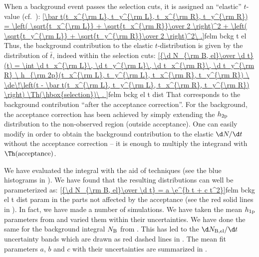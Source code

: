 When a background event passes the selection cuts, it is assigned an ``elastic'' $t$-value (cf.~):
\eqref{\bar t(t_x^{\rm L}, t_y^{\rm L}, t_x^{\rm R}, t_y^{\rm R})
= \left( \sqrt{t_x^{\rm L}} + \sqrt{t_x^{\rm R}}\over 2 \right)^2 + \left( \sqrt{t_y^{\rm L}} + \sqrt{t_y^{\rm R}}\over 2 \right)^2\ .}{felm bckg t el}
Thus, the background contribution to the elastic $t$-distribution is given by the distribution of $\bar t$, indeed within the selection cuts:
\eqref{{\d N_{\rm B, el}\over \d t}(t) = \int
	\d t_x^{\rm L}\, \d t_y^{\rm L}\, \d t_x^{\rm R}\, \d t_y^{\rm R}
	\ h_{\rm 2p}(t_x^{\rm L}, t_y^{\rm L}, t_x^{\rm R}, t_y^{\rm R})
	\ \de\!\left(t - \bar t(t_x^{\rm L}, t_y^{\rm L}, t_x^{\rm R}, t_y^{\rm R}) \right)
	\Th(\hbox{selection})\ .
}{felm bckg el t dist}
That corresponds to the background contribution ``after the acceptance correction''. For the background, the acceptance correction has been achieved by simply extending the $h_{\rm 2p}$ distribution to the non-observed region (outside acceptance). One can easily modify  in order to obtain the background contribution to the elastic $\d N/\d t$ without the acceptance correction -- it is enough to multiply the integrand with $\Th(\hbox{acceptance})$.

We have evaluated the integral  with the aid of  techniques (see the blue histograms in ). We have found that the resulting distributions can well be parameterized as:
\eqref{{\d N_{\rm B, el}\over \d t} = a \e^{b t + c t^2}}{felm bckg el t dist param}
in the parts not affected by the acceptance (see the red solid lines in ). In fact, we have made a number of  simulations. We have taken the mean $h_{\rm 1p}$ parameters from  and varied them within their uncertainties. We have done the same for the background integral $N_{\rm B}$ from . This has led to the $\d N_{\rm B,el}/\d t$ uncertainty bands which are drawn as red dashed lines in . The mean fit parameters $a$, $b$ and $c$ with their uncertainties are summarized in .



